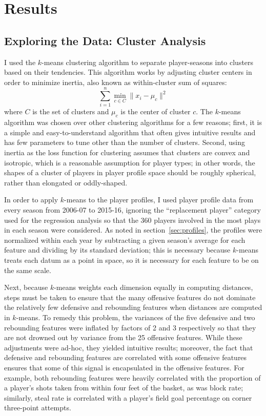 
\chapter{Results}
\label{ch:results}

\section{Exploring the Data: Cluster Analysis}

 I used the $k$-means
clustering algorithm to separate player-seasons into clusters based on their
tendencies. This algorithm works by adjusting cluster centers in order to minimize
inertia, also known as within-cluster sum of squares: $$ \sum_{i=1}^n \min_{c \in C}
\lVert x_i - \mu_c \rVert^2 $$ where $C$ is the set of clusters and $\mu_c$ is the
center of cluster $c$. The $k$-means algorithm was chosen over other clustering
algorithms for a few reasons; first, it is a simple and easy-to-understand algorithm
that often gives intuitive results and has few parameters to tune other than the
number of clusters. Second, using inertia as the loss function for clustering
assumes that clusters are convex and isotropic, which is a reasonable assumption for
player types; in other words, the shapes of a cluster of players in player profile
space should be roughly spherical, rather than elongated or oddly-shaped.

In order to apply $k$-means to the player profiles, I used player profile data from
every season from 2006-07 to 2015-16, ignoring the ``replacement player'' category
used for the regression analysis so that the 360 players involved in the most plays
in each season were considered. As noted in section~\ref{sec:profiles}, the profiles
were normalized within each year by subtracting a given season's average for each
feature and dividing by its standard deviation; this is necessary because $k$-means
treats each datum as a point in space, so it is necessary for each feature to be on
the same scale.

Next, because $k$-means weights each dimension equally in computing distances, steps
must be taken to ensure that the many offensive features do not dominate the
relatively few defensive and rebounding features when distances are computed in
$k$-means. To remedy this problem, the variances of the five defensive and two
rebounding features were inflated by factors of 2 and 3 respectively so that they
are not drowned out by variance from the 25 offensive features. While these
adjustments were ad-hoc, they yielded intuitive results; moreover, the fact that
defensive and rebounding features are correlated with some offensive features
ensures that some of this signal is encapsulated in the offensive features. For
example, both rebounding features were heavily correlated with the proportion of a
player's shots taken from within four feet of the basket, as was block rate;
similarly, steal rate is correlated with a player's field goal percentage on corner
three-point attempts.

